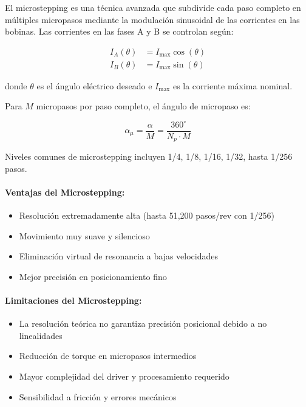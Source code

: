 El microstepping es una técnica avanzada que subdivide cada paso completo en múltiples micropasos mediante la modulación sinusoidal de las corrientes en las bobinas. Las corrientes en las fases A y B se controlan según:

\begin{equation}
\begin{aligned}
I_A(\theta) &= I_{\max} \cos(\theta) \\
I_B(\theta) &= I_{\max} \sin(\theta)
\end{aligned}
\end{equation}

donde $\theta$ es el ángulo eléctrico deseado e $I_{\max}$ es la corriente máxima nominal.

Para $M$ micropasos por paso completo, el ángulo de micropaso es:

\begin{equation}
\alpha_{\mu} = \frac{\alpha}{M} = \frac{360^\circ}{N_p \cdot M}
\end{equation}

Niveles comunes de microstepping incluyen 1/4, 1/8, 1/16, 1/32, hasta 1/256 pasos.

\paragraph{Ventajas del Microstepping:}

\begin{itemize}
    \item Resolución extremadamente alta (hasta 51,200 pasos/rev con 1/256)
    \item Movimiento muy suave y silencioso
    \item Eliminación virtual de resonancia a bajas velocidades
    \item Mejor precisión en posicionamiento fino
\end{itemize}

\paragraph{Limitaciones del Microstepping:}

\begin{itemize}
    \item La resolución teórica no garantiza precisión posicional debido a no linealidades
    \item Reducción de torque en micropasos intermedios
    \item Mayor complejidad del driver y procesamiento requerido
    \item Sensibilidad a fricción y errores mecánicos
\end{itemize}

